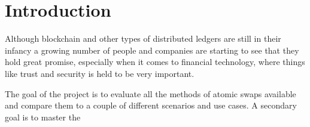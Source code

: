 
\chapter{Introduction}
Although blockchain and other types of distributed ledgers are still in their
infancy a growing number of people and companies are starting to see that they
hold great promise, especially when it comes to financial technology, where
things like trust and security is held to be very important.






The goal of the project is to evaluate all the methods of atomic swaps available
and compare them to a couple of different scenarios and use cases. A secondary
goal is to master the


